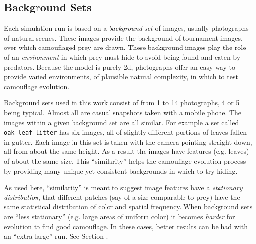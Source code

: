 \documentclass[letterpaper]{article}
\newcommand{\jargon}[1]{\textit{#1}}
\begin{document}
\subsection{Background Sets}
\label{subsec:background_sets}
Each simulation run is based on a \jargon{background set} of images, usually photographs of natural scenes. These images provide the background of tournament images, over which camouflaged prey are drawn. These background images play the role of an \jargon{environment} in which prey must hide to avoid being found and eaten by predators. Because the model is purely 2d, photographs offer an easy way to provide varied environments, of plausible natural complexity, in which to test camouflage evolution.
\par
Background sets used in this work consist of from 1 to 14 photographs, 4 or 5 being typical. Almost all are casual snapshots taken with a mobile phone. The images within a given background set are all similar. For example a set called \texttt{oak\_leaf\_litter} has six images, all of slightly different portions of leaves fallen in gutter. Each image in this set is taken with the camera pointing straight down, all from about the same height. As a result the images have features (e.g. leaves) of about the same size. This “similarity” helps the camouflage evolution process by providing many unique yet consistent backgrounds in which to try hiding.
\par
As used here, “similarity” is meant to suggest image features have a \jargon{stationary distribution}, that different patches (say of a size comparable to prey) have the same statistical distribution of color and spatial frequency. When background sets are “less stationary” (e.g. large areas of uniform color) it becomes \jargon{harder} for evolution to find good camouflage. In these cases, better results can be had with an “extra large” run. See Section .
\par

\end{document}
